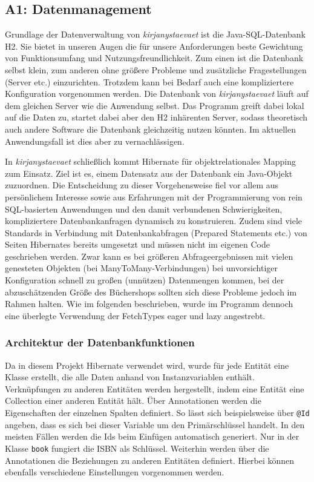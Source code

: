 	
	\subsection{A1: Datenmanagement}\label{sec:umsetzung:DB:DM}
	Grundlage der Datenverwaltung von \textit{kirjanystaevaet} ist die Java-SQL-Datenbank H2. Sie bietet in unseren Augen die für unsere Anforderungen beste Gewichtung von Funktionsumfang und Nutzungsfreundlichkeit. Zum einen ist die Datenbank selbst klein, zum anderen ohne größere Probleme und zusätzliche Fragestellungen (Server etc.) einzurichten. Trotzdem kann bei Bedarf auch eine kompliziertere Konfiguration vorgenommen werden. Die Datenbank von \textit{kirjanystaevaet} läuft auf dem gleichen Server wie die Anwendung selbst. Das Programm greift dabei lokal auf die Daten zu, startet dabei aber den H2 inhärenten Server, sodass theoretisch auch andere Software die Datenbank gleichzeitig nutzen könnten. Im aktuellen Anwendungsfall ist dies aber zu vernachlässigen.
	
	In \textit{kirjanystaevaet} schließlich kommt Hibernate für objektrelationales Mapping zum Einsatz. Ziel ist es, einem Datensatz aus der Datenbank ein Java-Objekt zuzuordnen. Die Entscheidung zu dieser Vorgehensweise fiel vor allem aus persönlichem Interesse sowie aus Erfahrungen mit der Programmierung von rein SQL-basierten Anwendungen und den damit verbundenen Schwierigkeiten, kompliziertere Datenbankanfragen dynamisch zu konstruieren. Zudem sind viele Standards in Verbindung mit Datenbankabfragen (Prepared Statements etc.) von Seiten Hibernates bereits umgesetzt und müssen nicht im eigenen Code geschrieben werden. Zwar kann es bei größeren Abfrageergebnissen mit vielen genesteten Objekten (bei ManyToMany-Verbindungen) bei unvorsichtiger Konfiguration schnell zu großen (unnützen) Datenmengen kommen, bei der abzuschätzenden Größe des Büchershops sollten sich diese Probleme jedoch im Rahmen halten. Wie im folgenden beschrieben, wurde im Programm dennoch eine überlegte Verwendung der FetchTypes eager und lazy angestrebt.
		
		\subsubsection{Architektur der Datenbankfunktionen}\label{sec:umsetzung:DB:Funktionen}
		Da in diesem Projekt Hibernate verwendet wird, wurde für jede Entität eine Klasse erstellt, die alle Daten anhand von Instanzvariablen enthält. Verknüpfungen zu anderen Entitäten werden hergestellt, indem eine Entität eine Collection einer anderen Entität hält. Über Annotationen werden die Eigenschaften der einzelnen Spalten definiert. So lässt sich beispielsweise über \texttt{@Id} angeben, dass es sich bei dieser Variable um den Primärschlüssel handelt. In den meisten Fällen werden die Ids beim Einfügen automatisch generiert. Nur in der Klasse \texttt{book} fungiert die ISBN als Schlüssel. Weiterhin werden über die Annotationen die Beziehungen zu anderen Entitäten definiert. Hierbei können ebenfalls verschiedene Einstellungen vorgenommen werden.
		
